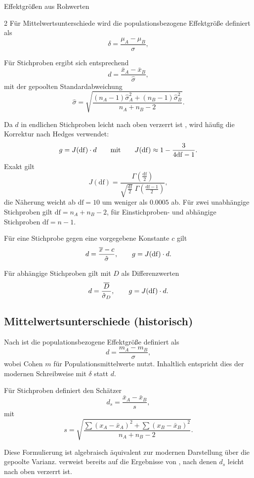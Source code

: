 \begin{formulaBox}{Effektgrößen aus Rohwerten}{}
\begin{multicols}{2}
Für Mittelwertsunterschiede wird die populationsbezogene Effektgröße definiert als
\[
\delta = \frac{\mu_A - \mu_B}{\sigma},
\]

Für Stichproben ergibt sich entsprechend
\[
d = \frac{\bar{x}_A - \bar{x}_B}{\hat{\sigma}},
\]
mit der gepoolten Standardabweichung
\[
\hat{\sigma} =
\sqrt{
\frac{
(n_A - 1)\hat{\sigma}_A^2 + (n_B - 1)\hat{\sigma}_B^2
}{
n_A + n_B - 2
}
}.
\]

Da $d$ in endlichen Stichproben leicht nach oben verzerrt ist \parencite{hedges1981}, wird häufig die Korrektur nach Hedges verwendet:
\[
g = J(\mathrm{df})\cdot d
\qquad\text{mit}\qquad
J(\mathrm{df}) \approx 1-\frac{3}{4\mathrm{df}-1}.
\]
\label{formel:hedges-j}%
Exakt gilt \parencite{hedges1981}
\[
J(\mathrm{df}) = \frac{\Gamma\left(\frac{\mathrm{df}}{2}\right)}{\sqrt{\frac{\mathrm{df}}{2}}\;\Gamma\left(\frac{\mathrm{df}-1}{2}\right)},
\]
die Näherung weicht ab $\mathrm{df}=10$ um weniger als $0.0005$ ab.
Für zwei unabhängige Stichproben gilt $\mathrm{df}=n_A+n_B-2$, für Einstichproben- und abhängige Stichproben $\mathrm{df}=n-1$.

Für eine Stichprobe gegen eine vorgegebene Konstante $c$ gilt
\[
d = \frac{\overline{x} - c}{\hat{\sigma}},
\qquad
g = J(\mathrm{df})\cdot d.
\]

Für abhängige Stichproben gilt mit $D$ als Differenzwerten
\[
d = \frac{\overline{D}}{\hat{\sigma}_{D}},
\qquad
g = J(\mathrm{df})\cdot d.
\]


\subsection*{Mittelwertsunterschiede (historisch)}

Nach \textcite[][Formel~2.2.1]{cohen1988} ist die populationsbezogene Effektgröße definiert als
\[
d = \frac{m_A - m_B}{\sigma},
\]
wobei Cohen $m$ für Populationsmittelwerte nutzt. Inhaltlich entspricht dies der modernen Schreibweise mit $\delta$ statt $d$.

Für Stichproben definiert \textcite[][Formel~2.5.1]{cohen1988} den Schätzer
\[
d_s = \frac{\bar{x}_A - \bar{x}_B}{s},
\]
mit
\[
s =
\sqrt{
\frac{
\sum (x_A - \bar{x}_A)^2
+
\sum (x_B - \bar{x}_B)^2
}{
n_A + n_B - 2
}
}.
\]

Diese Formulierung ist algebraisch äquivalent zur modernen Darstellung über die gepoolte Varianz. \textcite{cohen1988} verweist bereits auf die Ergebnisse von \textcite{hedges1981}, nach denen $d_s$ leicht nach oben verzerrt ist.

\end{multicols}
\end{formulaBox}
